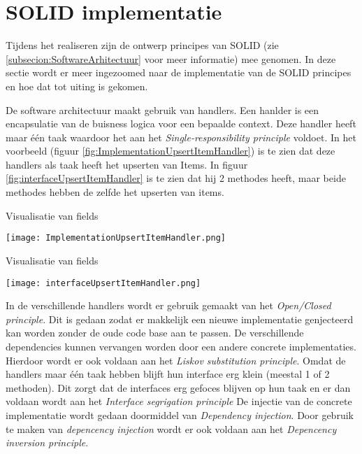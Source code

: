 \section{SOLID implementatie}
Tijdens het realiseren zijn de ontwerp principes van SOLID (zie \ref{subsecion:SoftwareArhitectuur} voor meer informatie) mee genomen.
In deze sectie wordt er meer ingezoomed naar de implementatie van de SOLID principes en hoe dat tot uiting is gekomen.

\whitespace
De software architectuur maakt gebruik van handlers.
Een hanlder is een encapsulatie van de buisness logica voor een bepaalde context.
Deze handler heeft maar één taak waardoor het aan het \textit{Single-responsibility principle} voldoet.
In het voorbeeld (figuur \ref{fig:ImplementationUpsertItemHandler}) is te zien dat deze handlers als taak heeft het upserten van Items.
In figuur \ref{fig:interfaceUpsertItemHandler} is te zien dat hij 2 methodes heeft, maar beide methodes hebben de zelfde  het upserten van items.

\whitespace
\begin{graphic}
    \captionsetup{type=figure}
    \caption{Visualisatie van fields}
    \texttt{[image: ImplementationUpsertItemHandler.png]}
    \label{fig:ImplementationUpsertItemHandler}
\end{graphic}

\whitespace[2]
\begin{graphic}
    \captionsetup{type=figure}
    \caption{Visualisatie van fields}
    \texttt{[image: interfaceUpsertItemHandler.png]}
    \label{fig:interfaceUpsertItemHandler}
\end{graphic}

\newpage
\whitespace[2]
In de verschillende handlers wordt er gebruik gemaakt van het \textit{Open\slash Closed principle}.
Dit is gedaan zodat er makkelijk een nieuwe implementatie genjecteerd kan worden zonder de oude code base aan te passen.
De verschillende dependencies kunnen vervangen worden door een andere concrete implementaties.
Hierdoor wordt er ook voldaan aan het \textit{Liskov substitution principle}.
Omdat de handlers maar één taak hebben blijft hun interface erg klein (meestal 1 of 2 methoden).
Dit zorgt dat de interfaces erg gefoces blijven op hun taak en er dan voldaan wordt aan het \textit{Interface segrigation principle}
De injectie van de concrete implementatie wordt gedaan doormiddel van \textit{Dependency injection}.
Door gebruik te maken van \textit{depencency injection} wordt er ook voldaan aan het \textit{Depencency inversion principle}.

